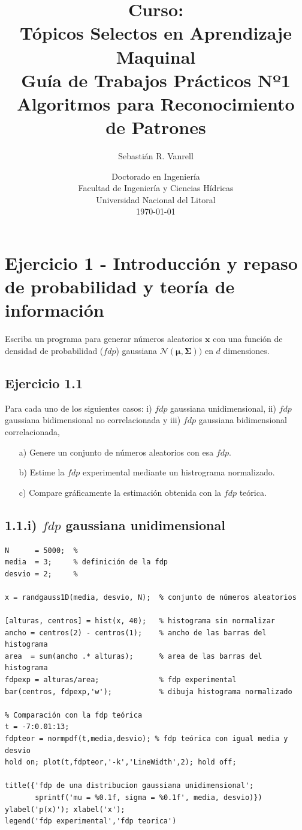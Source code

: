 \documentclass[11pt,a4paper,final]{article}
\author{Sebastián R. Vanrell\\[3em]}
\title{{\large Curso:}\\\medskip
       {\Large Tópicos Selectos en Aprendizaje Maquinal}\\[3em]
       \textsf{Guía de Trabajos Prácticos Nº1}\\\bigskip
       \textsf{Algoritmos para Reconocimiento de Patrones}\\[3em]}
\date{Doctorado en Ingeniería\\\bigskip
      Facultad de Ingeniería y Ciencias Hídricas\\\bigskip
      Universidad Nacional del Litoral \\[5em]
      \today}
\begin{document}
\renewcommand{\tablename}{Tabla}

\maketitle
\newpage

\tableofcontents

\newpage


\section{Ejercicio 1 - Introducción y repaso de probabilidad y teoría de información}


Escriba un programa para generar números aleatorios $\mathbf{x}$ con una función de densidad de probabilidad ($fdp$) gaussiana $\mathcal{N}(\mathbf{\mu},\mathbf{\Sigma}))$ en $d$ dimensiones.


\subsection{Ejercicio 1.1}

Para cada uno de los siguientes casos: i) $fdp$ gaussiana unidimensional, ii) $fdp$ gaussiana bidimensional no correlacionada y iii) $fdp$ gaussiana bidimensional correlacionada,

\begin{itemize}
   \item[a)] Genere un conjunto de números aleatorios con esa $fdp$.
   \item[b)] Estime la $fdp$ experimental mediante un histrograma normalizado.
   \item[c)] Compare gráficamente la estimación obtenida con la $fdp$ teórica.
\end{itemize}


\subsection*{1.1.i) $fdp$ gaussiana unidimensional}

\begin{verbatim}
N      = 5000;  %
media  = 3;     % definición de la fdp
desvio = 2;     %

x = randgauss1D(media, desvio, N);  % conjunto de números aleatorios

[alturas, centros] = hist(x, 40);   % histograma sin normalizar
ancho = centros(2) - centros(1);    % ancho de las barras del histograma
area  = sum(ancho .* alturas);      % area de las barras del histograma
fdpexp = alturas/area;              % fdp experimental
bar(centros, fdpexp,'w');           % dibuja histograma normalizado

% Comparación con la fdp teórica
t = -7:0.01:13;
fdpteor = normpdf(t,media,desvio); % fdp teórica con igual media y desvio
hold on; plot(t,fdpteor,'-k','LineWidth',2); hold off;

title({'fdp de una distribucion gaussiana unidimensional';
       sprintf('mu = %0.1f, sigma = %0.1f', media, desvio)})
ylabel('p(x)'); xlabel('x');
legend('fdp experimental','fdp teorica')
\end{verbatim}
\end{document}

